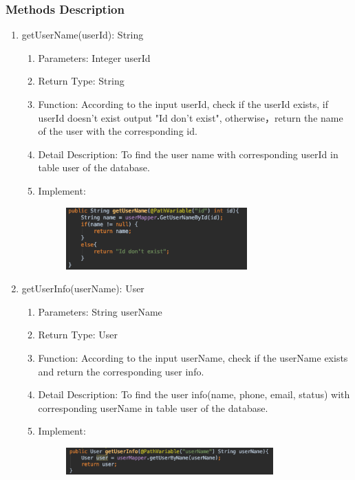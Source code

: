 \documentclass[16pt]{scrreprt}
\begin{document}
\subsubsection{Methods Description}
\begin{enumerate}
    \item getUserName(userId): String
    \begin{enumerate}
        \item Parameters: Integer userId
        \item Return Type: String
        \item Function: According to the input userId, check if the userId exists, if userId doesn't exist output "Id don't exist", otherwise，return the name of the user with the corresponding id.
        \item Detail Description: To find the user name with corresponding userId in table user of the database.
        \item Implement:
        \begin{figure}[H]
    \centering
    \includegraphics[width=0.7\textwidth]{diagrams/getusername1.png}\\
\end{figure}
    \end{enumerate}
    \item getUserInfo(userName): User
    \begin{enumerate}
        \item Parameters: String userName
        \item Return Type: User
        \item Function: According to the input userName, check if the userName exists and return the corresponding user info.
        \item Detail Description: To find the user info(name, phone, email, status) with corresponding userName in table user of the database.
        \item Implement:
        \begin{figure}[H]
    \centering
    \includegraphics[width=0.8\textwidth]{diagrams/getuserinfo.png}\\

\end{figure}
\end{enumerate}
\end{enumerate}
\end{document}
